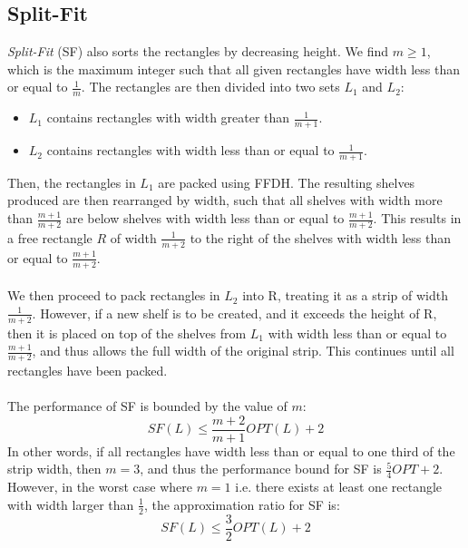\documentclass{article}
\begin{document}
\subsection{Split-Fit}
\textit{Split-Fit} (SF) also sorts the rectangles by decreasing height. We find $m \geq 1$, which is the maximum integer such that all given rectangles have width less than or equal to $\frac{1}{m}$. The rectangles are then divided into two sets $L_1$ and $L_2$:
\begin{itemize}
\item $L_1$ contains rectangles with width greater than $\frac{1}{m+1}$.
\item $L_2$ contains rectangles with width less than or equal to $\frac{1}{m+1}$.
\end{itemize}
Then, the rectangles in $L_1$ are packed using FFDH. The resulting shelves produced are then rearranged by width, such that all shelves with width more than $\frac{m+1}{m+2}$ are below shelves with width less than or equal to $\frac{m+1}{m+2}$. This results in a free rectangle $R$ of width $\frac{1}{m+2}$ to the right of the shelves with width less than or equal to $\frac{m+1}{m+2}$.\\
\\
We then proceed to pack rectangles in $L_2$ into R, treating it as a strip of width $\frac{1}{m+2}$. However, if a new shelf is to be created, and it exceeds the height of R, then it is placed on top of the shelves from $L_1$ with width less than or equal to $\frac{m+1}{m+2}$, and thus allows the full width of the original strip. This continues until all rectangles have been packed.\\
\\
The performance of SF is bounded by the value of $m$:
\[
	SF(L) \leq \frac{m+2}{m+1}OPT(L) + 2
\]
In other words, if all rectangles have width less than or equal to one third of the strip width, then $m = 3$, and thus the performance bound for SF is $\frac{5}{4}OPT + 2$. However, in the worst case where $m = 1$ i.e. there exists at least one rectangle with width larger than $\frac{1}{2}$, the approximation ratio for SF is:
\[
	SF(L) \leq \frac{3}{2}OPT(L) + 2
\]
\end{document}
